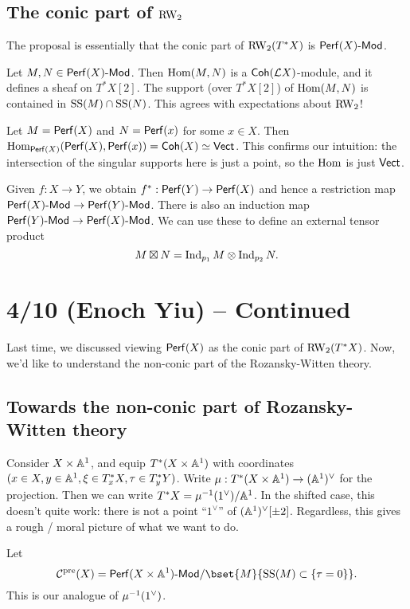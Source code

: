 \documentclass{article}
\begin{document}
\subsection{The conic part of $\RW_2$}

The proposal is essentially that the conic part of $\RW_2(T^* X)$ is $\Perf(X)\dMod$.

Let $M, N \in \Perf(X)\dMod$.
Then $\Hom(M, N)$ is a $\Coh(\Lc X)$-module, and it defines a sheaf on $T^* X[2]$.
The support (over $T^* X[2]$) of $\Hom(M, N)$ is contained in $\SSop(M) \cap \SSop(N)$.
This agrees with expectations about $\RW_2$!

\begin{ex}
	Let $M = \Perf(X)$ and $N = \Perf(x)$ for some $x \in X$.
	Then $\Hom_{\Perf(X)}(\Perf(X), \Perf(x)) = \Coh(X) \simeq \Vect$.
	This confirms our intuition: the intersection of the singular supports here is just a point, so the $\Hom$ is just $\Vect$.
\end{ex}

Given $f: X \to Y$, we obtain $f^*: \Perf(Y) \to \Perf(X)$ and hence a restriction map $\Perf(X)\dMod \to \Perf(Y)\dMod$.
There is also an induction map $\Perf(Y)\dMod \to \Perf(X)\dMod$.
We can use these to define an external tensor product
\[
	M \boxtimes N = \Indop_{p_1} M \otimes \Indop_{p_2} N.
\]

\section{4/10 (Enoch Yiu) -- Continued}

Last time, we discussed viewing $\Perf(X)$ as the conic part of $\RW_2(T^* X)$.
Now, we'd like to understand the non-conic part of the Rozansky-Witten theory.

\subsection{Towards the non-conic part of Rozansky-Witten theory}

Consider $X \times \AA^1$, and equip $T^*(X \times \AA^1)$ with coordinates $(x \in X, y \in \AA^1, \xi \in T^*_x X, \tau \in T^*_y Y)$.
Write $\mu: T^*(X \times \AA^1) \to (\AA^1)^\vee$ for the projection.
Then we can write $T^* X = \mu\inv(1^\vee) / \AA^1$.
In the shifted case, this doesn't quite work: there is not a point ``$1^\vee$'' of $(\AA^1)^\vee[\pm 2]$.
Regardless, this gives a rough / moral picture of what we want to do.

Let 
\[
	\Cc^\pre(X) = \Perf(X \times \AA^1)\dMod / \bset{M}{\SSop(M) \subset \{ \tau = 0 \}}.
\]
This is our analogue of $\mu\inv(1^\vee)$.
\end{document}

